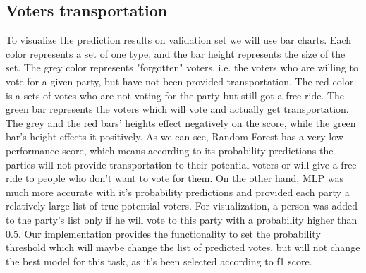 \documentclass[12pt]{article}
\begin{document}
\subsection{Voters transportation}
To visualize the prediction results on validation set we will use bar charts. Each color represents a set of one type, and the bar height represents the size of the set. The grey color represents "forgotten" voters, i.e. the voters who are willing to vote for a given party, but have not been provided transportation. The red color is a sets of votes who are not voting for the party but still got a free ride. The green bar represents the voters which will vote and actually get transportation. The grey and the red bars' heights effect negatively on the score, while the green bar's height effects it positively. As we can see, Random Forest has a very low performance score, which means according to its probability predictions the parties will not provide transportation to their potential voters or will give a free ride to people who don't want to vote for them. On the other hand, MLP was much more accurate with it's probability predictions and provided each party a relatively large list of true potential voters. For visualization, a person was added to the party's list only if he will vote to this party with a probability higher than $0.5$. Our implementation provides the functionality to set the probability threshold which will maybe change the list of predicted votes, but will not change the best model for this task, as it's been selected according to f1 score. 
\end{document}
